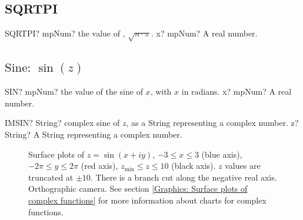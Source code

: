\subsection{SQRTPI}

\begin{mpFunctionsExtract}
	\mpWorksheetFunctionOneNotImplemented
	{SQRTPI? mpNum? the value of , $\sqrt{n \cdot \pi}$.}
	{x? mpNum? A real number.}
\end{mpFunctionsExtract}







\newpage
\subsection{\texorpdfstring{$\text{Sine: }\sin(z)$}{sin}}

\begin{mpFunctionsExtract}
	\mpWorksheetFunctionOneNotImplemented
	{SIN? mpNum? the value of the sine of $x$, with $x$ in radians.}
	{x? mpNum? A real number.}
\end{mpFunctionsExtract}

\vspace{0.6cm}
\begin{mpFunctionsExtract}
	\mpWorksheetFunctionOneNotImplemented
	{IMSIN? String? complex sine of $z$, as a String representing a complex number.}
	{z? String? A String representing a complex number.}
\end{mpFunctionsExtract}


\begin{figure}[ht]%
	\centering
	\qquad
	\caption[Complex Sine]{Surface plots of $z = \sin(x + iy)$, $-3 \leq x \leq 3$ (blue axis), $-2 \pi \leq y \leq 2\pi$ (red axis), $z_{\text{min}} \leq z \leq 10$ (black axis). $z$ values are truncated at $\pm 10$. There is a branch cut along the negative real axis. Orthographic camera. See section \ref{Graphics: Surface plots of complex functions} for more information about charts for complex functions.} 
	\label{fig:Complex Sine}%
\end{figure}


